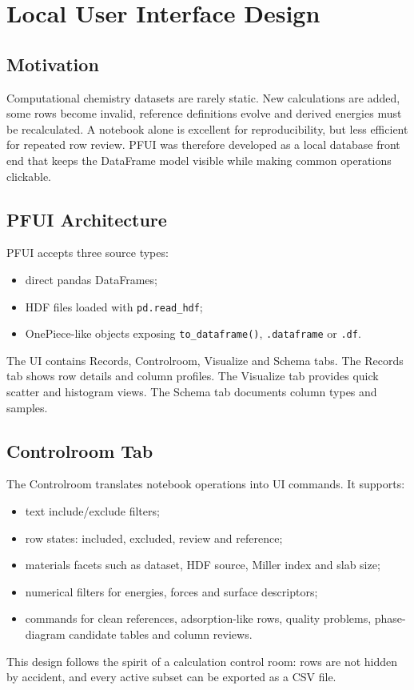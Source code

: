 \documentclass[12pt,a4paper,oneside]{report}
\begin{document}
\chapter{Local User Interface Design}

\section{Motivation}

Computational chemistry datasets are rarely static. New calculations are added,
some rows become invalid, reference definitions evolve and derived energies must
be recalculated. A notebook alone is excellent for reproducibility, but less
efficient for repeated row review. PFUI was therefore developed as a local
database front end that keeps the DataFrame model visible while making common
operations clickable.

\section{PFUI Architecture}

PFUI accepts three source types:
\begin{itemize}
  \item direct pandas DataFrames;
  \item HDF files loaded with \texttt{pd.read\_hdf};
  \item OnePiece-like objects exposing \texttt{to\_dataframe()},
  \texttt{.dataframe} or \texttt{.df}.
\end{itemize}
The UI contains Records, Controlroom, Visualize and Schema tabs. The Records
tab shows row details and column profiles. The Visualize tab provides quick
scatter and histogram views. The Schema tab documents column types and samples.

\section{Controlroom Tab}

The Controlroom translates notebook operations into UI commands. It supports:
\begin{itemize}
  \item text include/exclude filters;
  \item row states: included, excluded, review and reference;
  \item materials facets such as dataset, HDF source, Miller index and slab size;
  \item numerical filters for energies, forces and surface descriptors;
  \item commands for clean references, adsorption-like rows, quality problems,
  phase-diagram candidate tables and column reviews.
\end{itemize}
This design follows the spirit of a calculation control room: rows are not
hidden by accident, and every active subset can be exported as a CSV file.
\end{document}
